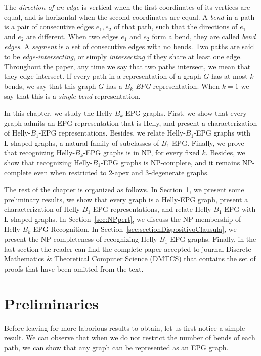 The \emph{direction of an edge} is vertical when the first coordinates of its vertices are equal, and is horizontal when the second coordinates are equal. A \emph {bend} in a path is a pair of consecutive edges $ e_1, e_2 $ of that path, such that the directions of $ e_1$ and $ e_2$ are different. When two edges $ e_1$ and $e_2 $ form a bend, they are called \emph { bend edges}. A \emph {segment} is a set of consecutive edges with no bends. %
Two paths are said to be \emph{edge-intersecting}, or simply  \emph{intersecting} if they share at least one edge. Throughout the paper, any time we say that two paths intersect, we mean that they edge-intersect. If every path in a representation of a graph $G$ has at most $k$ bends, we say that this graph $G$ has a \emph{$B_k$-EPG} representation. When $k = 1$ we say that this is a \emph{single bend} representation.

\medskip

In this chapter, we study the Helly-$B_k$-EPG graphs. First, we show that every graph admits an EPG representation that is Helly, and present a characterization of Helly-$B_1$-EPG representations. Besides, we relate Helly-$B_1$-EPG graphs with L-shaped graphs, a natural family of subclasses of $B_1$-EPG. Finally, we prove that recognizing Helly-$B_k$-EPG graphs is in NP, for every fixed $k$. Besides, we show that recognizing Helly-$B_1$-EPG graphs is NP-complete, and it remains NP-complete even when restricted to 2-apex and 3-degenerate graphs.

The rest of the chapter is organized as follows. In Section~\ref{sec:prelim}, we present some preliminary results, we show that every graph is a Helly-EPG graph, present a characterization of Helly-$B_1$-EPG representations, and relate Helly-$B_1$ EPG with L-shaped graphs. In Section~\ref{sec:NPpert}, we discuss the NP-membership of {\sc Helly-$B_k$ EPG Recognition}. In Section~\ref{sec:sectionDispositivoClausula}, we present the NP-completeness of recognizing Helly-$B_1$-EPG graphs. Finally, in the last section the reader can find the complete paper accepted to  journal Discrete Mathematics \& Theoretical Computer Science (DMTCS) that contains the set of proofs that have been omitted from the text.


\section{Preliminaries} \label{sec:prelim}

Before leaving for more laborious results to obtain, let us first notice a simple result. We can observe that when we do not restrict the number of bends of each path, we can show that any graph can be represented as an EPG graph.

